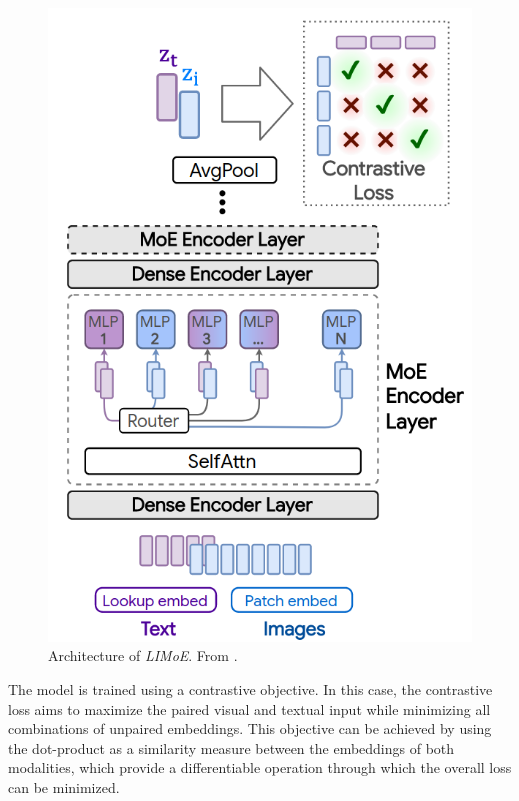 \documentclass[
]{krantz}
\begin{document}
\begin{figure}

{\centering \includegraphics[width=0.8\linewidth]{figures/03-03-multipurpose/LIMoE} 

}

\caption{Architecture of \emph{LIMoE}. From \citet{Mustafa2022}.}\label{fig:LIMoE}
\end{figure}



The model is trained using a contrastive objective. In this case, the contrastive loss aims to maximize the paired visual and textual input while minimizing all combinations of unpaired embeddings.
This objective can be achieved by using the dot-product as a similarity measure between the embeddings of both modalities, which provide a differentiable
operation through which the overall loss can be minimized.
\end{document}
